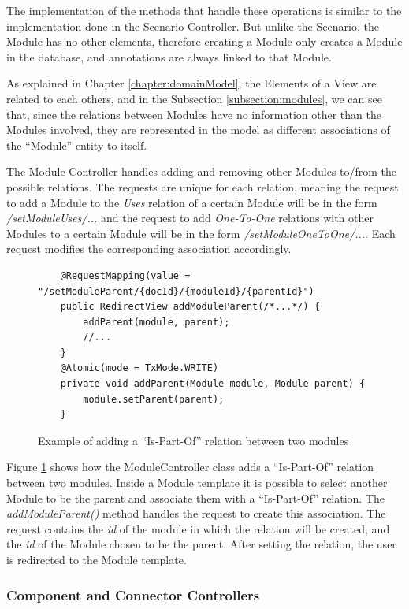 \documentclass{llncs}
\begin{document}
The implementation of the methods that handle these operations is similar to the implementation done in the Scenario Controller. But unlike the Scenario, the Module has no other elements, therefore creating a Module only creates a Module in the database, and annotations are always linked to that Module.

As explained in Chapter \ref{chapter:domainModel}, the Elements of a View are related to each others, and in the Subsection \ref{subsection:modules}, we can see that, since the relations between Modules have no information other than the Modules involved, they are represented in the model as different associations of the ``Module'' entity to itself. 

The Module Controller handles adding and removing other Modules to/from the possible relations. The requests are unique for each relation, meaning the request to add a Module to the \textit{Uses} relation of a certain Module will be in the form \textit{/setModuleUses/...} and the request to add \textit{One-To-One} relations with other Modules to a certain Module will be in the form \textit{/setModuleOneToOne/...}. Each request modifies the corresponding association accordingly.
\begin{figure}
\lstset{style=customjava}
\begin{lstlisting}
	@RequestMapping(value = "/setModuleParent/{docId}/{moduleId}/{parentId}")
	public RedirectView addModuleParent(/*...*/) {
		addParent(module, parent);
		//...
	}
	@Atomic(mode = TxMode.WRITE)
	private void addParent(Module module, Module parent) {
		module.setParent(parent);
	}	
\end{lstlisting}
\caption{Example of adding a ``Is-Part-Of'' relation between two modules}
\label{figure:ModuleControllerIsPartOf}
\end{figure} 

Figure \ref{figure:ModuleControllerIsPartOf} shows how the ModuleController class adds a ``Is-Part-Of'' relation between two modules. Inside a Module template it is possible to select another Module to be the parent and associate them with a ``Is-Part-Of'' relation. The \textit{addModuleParent()} method handles the request to create this association. The request contains the \textit{id} of the module in which the relation will be created, and the \textit{id} of the Module chosen to be the parent. After setting the relation, the user is redirected to the Module template.

\subsubsection{Component and Connector Controllers}
\end{document}
